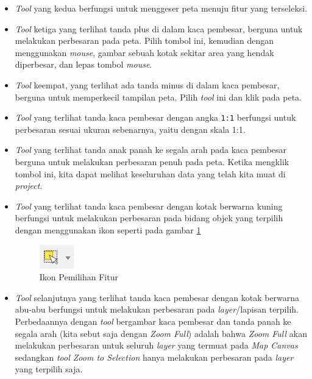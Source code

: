 \begin{enumerate}[A.]
\begin{enumerate}[1.]
\begin{itemize}
    \item \textit{Tool} yang kedua berfungsi untuk menggeser peta menuju fitur yang terseleksi.
    
    \item \textit{Tool} ketiga yang terlihat tanda plus di dalam kaca pembesar, berguna untuk melakukan perbesaran pada peta. Pilih tombol ini, kemudian dengan menggunakan \textit{mouse}, gambar sebuah kotak sekitar area yang hendak diperbesar, dan lepas tombol \textit{mouse}.
    
    \item \textit{Tool} keempat, yang terlihat ada tanda minus di dalam kaca pembesar, berguna untuk memperkecil tampilan peta. Pilih \textit{tool} ini dan klik pada peta.
    
    \item \textit{Tool} yang terlihat tanda kaca pembesar dengan angka \texttt{1:1} berfungsi untuk perbesaran sesuai ukuran sebenarnya, yaitu dengan skala 1:1.
    
    \item \textit{Tool} yang terlihat tanda anak panah ke segala arah pada kaca pembesar berguna untuk melakukan perbesaran penuh pada peta. Ketika mengklik tombol ini, kita dapat melihat keseluruhan data yang telah kita muat di \textit{project}.
    
    \item \textit{Tool} yang terlihat tanda kaca pembesar dengan kotak berwarna kuning berfungsi untuk melakukan perbesaran pada bidang objek yang terpilih dengan menggunakan ikon seperti pada gambar \ref{fig:selectfeatureicon}
    
\begin{figure}[H]
  \centering
  \includegraphics[scale=1]{./resources/010-select-feature-icon}
  \caption{Ikon Pemilihan Fitur}
  \label{fig:selectfeatureicon}
\end{figure}

    \item \textit{Tool} selanjutnya yang terlihat tanda kaca pembesar dengan kotak berwarna abu-abu berfungsi untuk melakukan perbesaran pada \textit{layer}/lapisan terpilih. Perbedaannya dengan \textit{tool} bergambar kaca pembesar dan tanda panah ke segala arah (kita sebut saja dengan \textit{Zoom Full}) adalah bahwa \textit{Zoom Full} akan melakukan perbesaran untuk seluruh \textit{layer} yang termuat pada \textit{Map Canvas} sedangkan \textit{tool Zoom to Selection} hanya melakukan perbesaran pada \textit{layer} yang terpilih saja.
    

\end{itemize}
\end{enumerate}
\end{enumerate}
